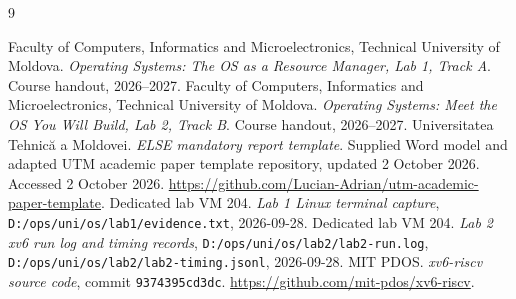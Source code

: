 \documentclass{assets/utmreport}
\begin{document}
\begin{thebibliography}{9}

 Faculty of Computers, Informatics and Microelectronics, Technical University of Moldova. \textit{Operating Systems: The OS as a Resource Manager, Lab 1, Track A}. Course handout, 2026--2027.
 Faculty of Computers, Informatics and Microelectronics, Technical University of Moldova. \textit{Operating Systems: Meet the OS You Will Build, Lab 2, Track B}. Course handout, 2026--2027.
 Universitatea Tehnică a Moldovei. \textit{ELSE mandatory report template}. Supplied Word model and adapted UTM academic paper template repository, updated 2 October 2026. Accessed 2 October 2026. \url{https://github.com/Lucian-Adrian/utm-academic-paper-template}.
 Dedicated lab VM 204. \textit{Lab 1 Linux terminal capture}, \texttt{D:/ops/uni/os/lab1/evidence.txt}, 2026-09-28.
 Dedicated lab VM 204. \textit{Lab 2 xv6 run log and timing records}, \texttt{D:/ops/uni/os/lab2/lab2-run.log}, \texttt{D:/ops/uni/os/lab2/lab2-timing.jsonl}, 2026-09-28.
 MIT PDOS. \textit{xv6-riscv source code}, commit \texttt{9374395cd3dc}. \url{https://github.com/mit-pdos/xv6-riscv}.
\end{thebibliography}
\end{document}
